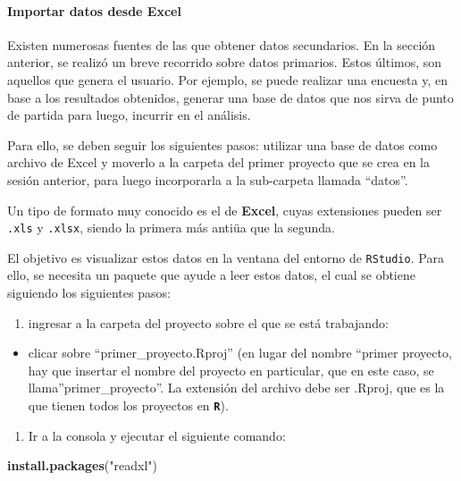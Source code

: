 \documentclass[
]{article}
\newenvironment{Shaded}{\begin{snugshade}}{\end{snugshade}}
\newcommand{\FunctionTok}[1]{\textcolor[rgb]{0.13,0.29,0.53}{\textbf{#1}}}
\newcommand{\NormalTok}[1]{#1}
\newcommand{\StringTok}[1]{\textcolor[rgb]{0.31,0.60,0.02}{#1}}
\providecommand{\tightlist}{%
  \setlength{\itemsep}{0pt}\setlength{\parskip}{0pt}}
\begin{document}
\hypertarget{importar-datos-desde-excel}{%
\paragraph{Importar datos desde Excel}\label{importar-datos-desde-excel}}

Existen numerosas fuentes de las que obtener datos secundarios. En la sección anterior, se realizó un breve recorrido sobre datos primarios. Estos últimos, son aquellos que genera el usuario. Por ejemplo, se puede realizar una encuesta y, en base a los resultados obtenidos, generar una base de datos que nos sirva de punto de partida para luego, incurrir en el análisis.

Para ello, se deben seguir los siguientes pasos: utilizar una base de datos como archivo de Excel y moverlo a la carpeta del primer proyecto que se crea en la sesión anterior, para luego incorporarla a la sub-carpeta llamada ``datos''.

Un tipo de formato muy conocido es el de \textbf{Excel}, cuyas extensiones pueden ser \texttt{.xls} y \texttt{.xlsx}, siendo la primera más antiüa que la segunda.

El objetivo es visualizar estos datos en la ventana del entorno de \texttt{RStudio}. Para ello, se necesita un paquete que ayude a leer estos datos, el cual se obtiene siguiendo los siguientes pasos:

\begin{enumerate}
\def\labelenumi{\arabic{enumi}.}
\tightlist
\item
  ingresar a la carpeta del proyecto sobre el que se está trabajando:
\end{enumerate}

\begin{itemize}
\tightlist
\item
  clicar sobre ``primer\_proyecto.Rproj'' (en lugar del nombre ``primer proyecto, hay que insertar el nombre del proyecto en particular, que en este caso, se llama''primer\_proyecto''. La extensión del archivo debe ser .Rproj, que es la que tienen todos los proyectos en \textbf{\texttt{R}}).
\end{itemize}

\begin{enumerate}
\def\labelenumi{\arabic{enumi}.}
\setcounter{enumi}{1}
\tightlist
\item
  Ir a la consola y ejecutar el siguiente comando:
\end{enumerate}

\begin{Shaded}
\begin{Highlighting}[]
\FunctionTok{install.packages}\NormalTok{(}\StringTok{"readxl"}\NormalTok{)}
\end{Highlighting}
\end{Shaded}
\end{document}
